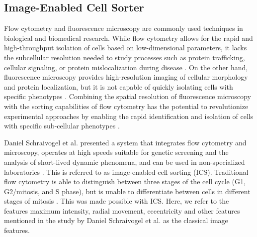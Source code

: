 \documentclass[12pt,a4paper]{article}
\begin{document}
\subsection{Image-Enabled Cell Sorter}
Flow cytometry and fluorescence microscopy are commonly used techniques in biological and biomedical research. While flow cytometry allows for the rapid and high-throughput isolation of cells based on low-dimensional parameters, it lacks the subcellular resolution needed to study processes such as protein trafficking, cellular signaling, or protein mislocalization during disease \cite{cossarizza_chang_radbruch_acs_adam_adamklages_agace_aghaeepour_akdis_allez_et_al._2019}. On the other hand, fluorescence microscopy provides high-resolution imaging of cellular morphology and protein localization, but it is not capable of quickly isolating cells with specific phenotypes \cite{Espina2006-iv}. Combining the spatial resolution of fluorescence microscopy with the sorting capabilities of flow cytometry has the potential to revolutionize experimental approaches by enabling the rapid identification and isolation of cells with specific sub-cellular phenotypes \cite{doi:10.1126/science.abj3013}.

Daniel Schraivogel et al. presented a system that integrates flow cytometry and microscopy, operates at high speeds suitable for genetic screening and the analysis of short-lived dynamic phenomena, and can be used in non-specialized laboratories \cite{doi:10.1126/science.abj3013}. This is referred to as image-enabled cell sorting (ICS). Traditional flow cytometry is able to distinguish between three stages of the cell cycle (G1, G2/mitosis, and S phase), but is unable to differentiate between cells in different stages of mitosis \cite{doi:10.1126/science.abj3013}. This was made possible with ICS. Here, we refer to the features maximum intensity, radial movement, eccentricity and other features mentioned in the study by Daniel Schraivogel et al. as the classical image features.
\end{document}
